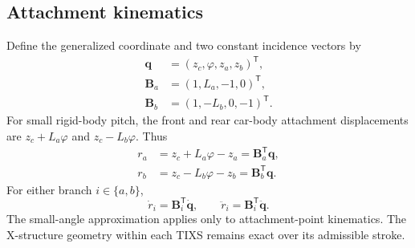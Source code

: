 \documentclass[a4paper,12pt]{article}
\numberwithin{equation}{section}
\newcommand{\vect}[1]{\boldsymbol{#1}}
\begin{document}
\subsection{Attachment kinematics}
Define the generalized coordinate and two constant incidence vectors by
\begin{equation}
\begin{aligned}
\vect q&=(z_c,\varphi,z_a,z_b)^{\mathsf T},\\
\vect B_a&=(1,L_a,-1,0)^{\mathsf T},\\
\vect B_b&=(1,-L_b,0,-1)^{\mathsf T}.
\end{aligned}
\label{eq:incidence}
\end{equation}
For small rigid-body pitch, the front and rear car-body attachment displacements are $z_c+L_a\varphi$ and $z_c-L_b\varphi$. Thus
\begin{align}
r_a
 &=z_c+L_a\varphi-z_a
 =\vect B_a^{\mathsf T}\vect q,
 \label{eq:relative-front}\\
r_b
 &=z_c-L_b\varphi-z_b
 =\vect B_b^{\mathsf T}\vect q.
 \label{eq:relative-rear}
\end{align}
For either branch $i\in\{a,b\}$,
\begin{equation}
\dot r_i=\vect B_i^{\mathsf T}\dot{\vect q},
\qquad
\ddot r_i=\vect B_i^{\mathsf T}\ddot{\vect q}.
\label{eq:relative-derivs}
\end{equation}
The small-angle approximation applies only to attachment-point kinematics. The X-structure geometry within each TIXS remains exact over its admissible stroke.
\end{document}
